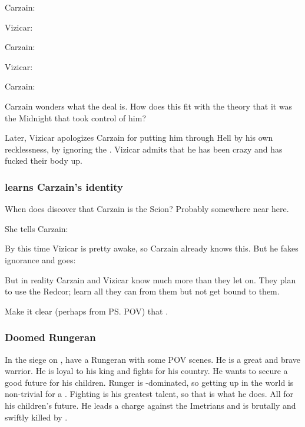 Carzain: 

Vizicar: 

Carzain: 

Vizicar: 

Carzain: 

Carzain wonders what the deal is. 
How does this fit with the theory that it was the Midnight \Qliphoth{} that took control of him? 

Later, Vizicar apologizes Carzain for putting him through Hell by his own recklessness, by ignoring the . 
Vizicar admits that he has been crazy and has fucked their body up. 





\subsubsection{\Esmerel learns Carzain's identity}
When does \Esmerel{} discover that Carzain is the Scion? 
Probably somewhere near here. 

She tells Carzain: 

By this time Vizicar is pretty awake, so Carzain already knows this. 
But he fakes ignorance and goes: 

But in reality Carzain and Vizicar know much more than they let on. 
They plan to use the Redcor; learn all they can from them but not get bound to them. 

Make it clear (perhaps from \ps{\Esmerel} POV) that . 





\subsubsection{Doomed Rungeran \scatha}
In the siege on \Forclin, have a Rungeran \scatha with some POV scenes.
He is a great and brave warrior.
He is loyal to his king and fights for his country.
He wants to secure a good future for his children.
Runger is \human-dominated, so getting up in the world is non-trivial for a \scatha.
Fighting is his greatest talent, so that is what he does.
All for his children's future.
He leads a charge against the Imetrians and is brutally and swiftly killed by \nycans.


